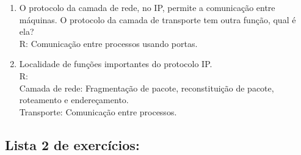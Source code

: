 \documentclass{article}
\begin{document}
\begin{enumerate}
	\item O protocolo da camada de rede, no IP, permite a comunicação entre máquinas. O protocolo da camada de transporte tem outra função, qual é ela?
	\\R: Comunicação entre processos usando portas.

	\item Localidade de funções importantes do protocolo IP.
	\\R:
	\\Camada de rede: Fragmentação de pacote, reconstituição de pacote, roteamento e endereçamento.
	\\Transporte: Comunicação entre processos.
\end{enumerate}




\newpage

\subsection{Lista 2 de exercícios:}
\end{document}
